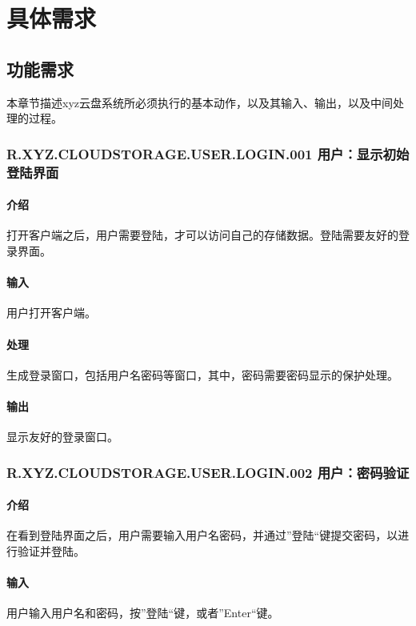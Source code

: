 \chapter{具体需求}
\section{功能需求}

本章节描述xyz云盘系统所必须执行的基本动作，以及其输入、输出，以及中间处理的过程。


\subsection{R.XYZ.CLOUDSTORAGE.USER.LOGIN.001 用户：显示初始登陆界面 }

\subsubsection{介绍}
打开客户端之后，用户需要登陆，才可以访问自己的存储数据。登陆需要友好的登录界面。

\subsubsection{输入}
用户打开客户端。

\subsubsection{处理}
生成登录窗口，包括用户名密码等窗口，其中，密码需要密码显示的保护处理。
\subsubsection{输出}
显示友好的登录窗口。



\subsection{R.XYZ.CLOUDSTORAGE.USER.LOGIN.002 用户：密码验证 }

\subsubsection{介绍}
在看到登陆界面之后，用户需要输入用户名密码，并通过”登陆“键提交密码，以进行验证并登陆。

\subsubsection{输入}
用户输入用户名和密码，按”登陆“键，或者”Enter“键。

